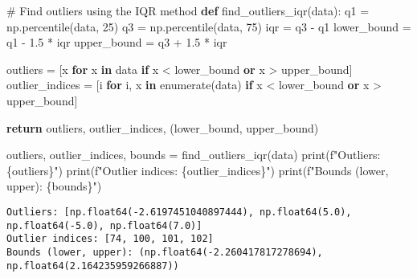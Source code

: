 \documentclass[
  letterpaper,
  DIV=11,
  numbers=noendperiod]{scrreprt}
\newenvironment{Shaded}{\begin{snugshade}}{\end{snugshade}}
\newcommand{\BuiltInTok}[1]{\textcolor[rgb]{0.00,0.23,0.31}{#1}}
\newcommand{\CommentTok}[1]{\textcolor[rgb]{0.37,0.37,0.37}{#1}}
\newcommand{\ControlFlowTok}[1]{\textcolor[rgb]{0.00,0.23,0.31}{\textbf{#1}}}
\newcommand{\DecValTok}[1]{\textcolor[rgb]{0.68,0.00,0.00}{#1}}
\newcommand{\FloatTok}[1]{\textcolor[rgb]{0.68,0.00,0.00}{#1}}
\newcommand{\KeywordTok}[1]{\textcolor[rgb]{0.00,0.23,0.31}{\textbf{#1}}}
\newcommand{\NormalTok}[1]{\textcolor[rgb]{0.00,0.23,0.31}{#1}}
\newcommand{\OperatorTok}[1]{\textcolor[rgb]{0.37,0.37,0.37}{#1}}
\newcommand{\SpecialCharTok}[1]{\textcolor[rgb]{0.37,0.37,0.37}{#1}}
\newcommand{\SpecialStringTok}[1]{\textcolor[rgb]{0.13,0.47,0.30}{#1}}
\begin{document}
\begin{Shaded}
\begin{Highlighting}[]
\CommentTok{\# Find outliers using the IQR method}
\KeywordTok{def}\NormalTok{ find\_outliers\_iqr(data):}
\NormalTok{    q1 }\OperatorTok{=}\NormalTok{ np.percentile(data, }\DecValTok{25}\NormalTok{)}
\NormalTok{    q3 }\OperatorTok{=}\NormalTok{ np.percentile(data, }\DecValTok{75}\NormalTok{)}
\NormalTok{    iqr }\OperatorTok{=}\NormalTok{ q3 }\OperatorTok{{-}}\NormalTok{ q1}
\NormalTok{    lower\_bound }\OperatorTok{=}\NormalTok{ q1 }\OperatorTok{{-}} \FloatTok{1.5} \OperatorTok{*}\NormalTok{ iqr}
\NormalTok{    upper\_bound }\OperatorTok{=}\NormalTok{ q3 }\OperatorTok{+} \FloatTok{1.5} \OperatorTok{*}\NormalTok{ iqr}
    
\NormalTok{    outliers }\OperatorTok{=}\NormalTok{ [x }\ControlFlowTok{for}\NormalTok{ x }\KeywordTok{in}\NormalTok{ data }\ControlFlowTok{if}\NormalTok{ x }\OperatorTok{\textless{}}\NormalTok{ lower\_bound }\KeywordTok{or}\NormalTok{ x }\OperatorTok{\textgreater{}}\NormalTok{ upper\_bound]}
\NormalTok{    outlier\_indices }\OperatorTok{=}\NormalTok{ [i }\ControlFlowTok{for}\NormalTok{ i, x }\KeywordTok{in} \BuiltInTok{enumerate}\NormalTok{(data) }\ControlFlowTok{if}\NormalTok{ x }\OperatorTok{\textless{}}\NormalTok{ lower\_bound }\KeywordTok{or}\NormalTok{ x }\OperatorTok{\textgreater{}}\NormalTok{ upper\_bound]}
    
    \ControlFlowTok{return}\NormalTok{ outliers, outlier\_indices, (lower\_bound, upper\_bound)}

\NormalTok{outliers, outlier\_indices, bounds }\OperatorTok{=}\NormalTok{ find\_outliers\_iqr(data)}
\BuiltInTok{print}\NormalTok{(}\SpecialStringTok{f"Outliers: }\SpecialCharTok{\{}\NormalTok{outliers}\SpecialCharTok{\}}\SpecialStringTok{"}\NormalTok{)}
\BuiltInTok{print}\NormalTok{(}\SpecialStringTok{f"Outlier indices: }\SpecialCharTok{\{}\NormalTok{outlier\_indices}\SpecialCharTok{\}}\SpecialStringTok{"}\NormalTok{)}
\BuiltInTok{print}\NormalTok{(}\SpecialStringTok{f"Bounds (lower, upper): }\SpecialCharTok{\{}\NormalTok{bounds}\SpecialCharTok{\}}\SpecialStringTok{"}\NormalTok{)}
\end{Highlighting}
\end{Shaded}

\begin{verbatim}
Outliers: [np.float64(-2.6197451040897444), np.float64(5.0), np.float64(-5.0), np.float64(7.0)]
Outlier indices: [74, 100, 101, 102]
Bounds (lower, upper): (np.float64(-2.260417817278694), np.float64(2.164235959266887))
\end{verbatim}
\end{document}
